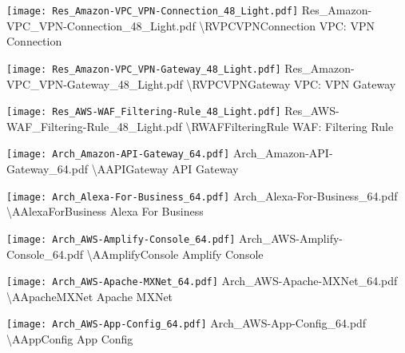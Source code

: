 {\texttt{[image: Res\_Amazon-VPC\_VPN-Connection\_48\_Light.pdf]}} {Res\_Amazon-VPC\_VPN-Connection\_48\_Light.pdf} {{\textbackslash}RVPCVPNConnection} {VPC: VPN Connection}

 {\texttt{[image: Res\_Amazon-VPC\_VPN-Gateway\_48\_Light.pdf]}} {Res\_Amazon-VPC\_VPN-Gateway\_48\_Light.pdf} {{\textbackslash}RVPCVPNGateway} {VPC: VPN Gateway}

 {\texttt{[image: Res\_AWS-WAF\_Filtering-Rule\_48\_Light.pdf]}} {Res\_AWS-WAF\_Filtering-Rule\_48\_Light.pdf} {{\textbackslash}RWAFFilteringRule} {WAF: Filtering Rule}

\resEnd
\archStart
{} {\texttt{[image: Arch\_Amazon-API-Gateway\_64.pdf]}} {Arch\_Amazon-API-Gateway\_64.pdf} {{\textbackslash}AAPIGateway} {API Gateway}

 {\texttt{[image: Arch\_Alexa-For-Business\_64.pdf]}} {Arch\_Alexa-For-Business\_64.pdf} {{\textbackslash}AAlexaForBusiness} {Alexa For Business}

 {\texttt{[image: Arch\_AWS-Amplify-Console\_64.pdf]}} {Arch\_AWS-Amplify-Console\_64.pdf} {{\textbackslash}AAmplifyConsole} {Amplify Console}

 {\texttt{[image: Arch\_AWS-Apache-MXNet\_64.pdf]}} {Arch\_AWS-Apache-MXNet\_64.pdf} {{\textbackslash}AApacheMXNet} {Apache MXNet}

 {\texttt{[image: Arch\_AWS-App-Config\_64.pdf]}} {Arch\_AWS-App-Config\_64.pdf} {{\textbackslash}AAppConfig} {App Config}

